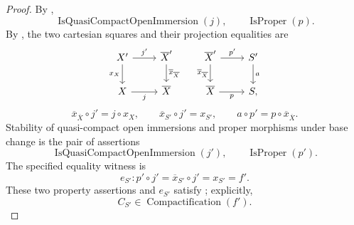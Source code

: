 \begin{proof}
  By ,
  \[
    \operatorname{IsQuasiCompactOpenImmersion}(j),
    \qquad
    \operatorname{IsProper}(p).
  \]
  By , the two cartesian
  squares and their projection equalities are
  \[
  \begin{tikzcd}
    X' \arrow[r,"j'"] \arrow[d,"x_X"'] &
      \overline X' \arrow[d,"\overline x_{\overline X}"] &
    \overline X' \arrow[r,"p'"] \arrow[d,"\overline x_{\overline X}"'] &
      S' \arrow[d,"a"]\\
    X \arrow[r,"j"'] & \overline X &
    \overline X \arrow[r,"p"'] & S,
  \end{tikzcd}
  \]
  \[
    \overline x_{\overline X}\circ j'=j\circ x_X,
    \qquad
    \overline x_{S'}\circ j'=x_{S'},
    \qquad
    a\circ p'=p\circ\overline x_{\overline X}.
  \]
  Stability of quasi-compact open immersions and proper morphisms under base
  change is the pair of assertions
  \[
    \operatorname{IsQuasiCompactOpenImmersion}(j'),
    \qquad
    \operatorname{IsProper}(p').
  \]
  The specified equality witness is
  \[
    e_{S'}\colon p'\circ j'
      =\overline x_{S'}\circ j'
      =x_{S'}=f'.
  \]
  These two property assertions and $e_{S'}$ satisfy
  ; explicitly,
  \[
    C_{S'}\in\operatorname{Compactification}(f').
  \]
\end{proof}

